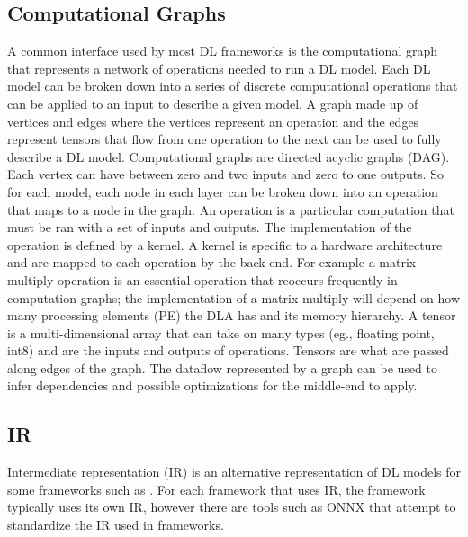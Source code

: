 \subsection{Computational Graphs}
A common interface used by most DL frameworks is the computational graph
\cite{tensorflow} \cite{cntk} that represents a network of operations needed to
run a DL model. Each DL model can be broken down into a series of discrete
computational operations that can be applied to an input to describe a given
model. A graph made up of vertices and edges where the vertices represent an
operation and the edges represent tensors that flow from one operation to the
next can be used to fully describe a DL model. Computational graphs are
directed acyclic graphs (DAG).  Each vertex can have between zero and two
inputs and zero to one outputs. So for each model, each node in each layer can
be broken down into an operation that maps to a node in the graph. An operation
is a particular computation that must be ran with a set of inputs and outputs.
The implementation of the operation is defined by a kernel. A kernel is
specific to a hardware architecture and are mapped to each operation by the
back-end. For example a matrix multiply operation is an essential operation
that reoccurs frequently in computation graphs; the implementation of a matrix
multiply will depend on how many processing elements (PE) the DLA has and its
memory hierarchy. A tensor is a multi-dimensional array that can take on many
types (eg., floating point, int8) and are the inputs and outputs of operations.
Tensors are what are passed along edges of the graph. The dataflow represented
by a graph can be used to infer dependencies and possible optimizations for the
middle-end to apply.





\subsection{IR}
Intermediate representation (IR) is an alternative representation of DL models
for some frameworks such as \cite{DLVM} \cite{nGraph} \cite{ONNX}. For each
framework that uses IR, the framework typically uses its own IR, however
there are tools such as ONNX that attempt to standardize the IR used in
frameworks. 

